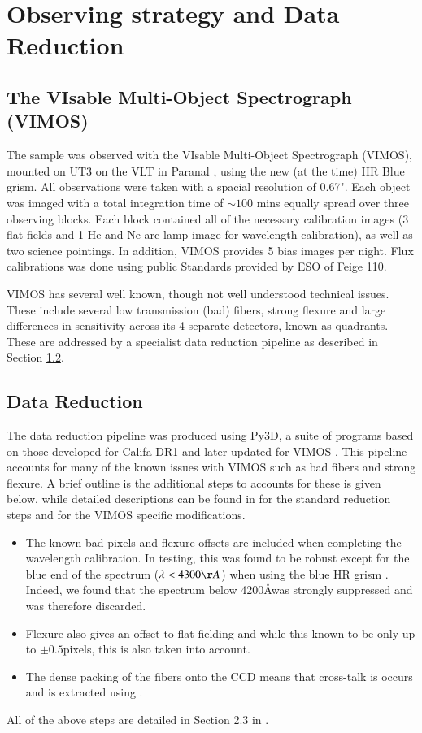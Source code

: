 \documentclass[fleqn,usenatbib,useAMS]{mnras}
\begin{document}
\section{Observing strategy and Data Reduction}
	\label{sec:obs}
	\subsection{The VIsable Multi-Object Spectrograph (VIMOS)}
		\label{subsec:VIMOS}
		The sample was observed with the VIsable Multi-Object Spectrograph (VIMOS), mounted on UT3 on the VLT in Paranal \citep{LeFevre2003}, using the new (at the time) HR Blue grism. All observations were taken with a spacial resolution of 0.67". Each object was imaged with a total integration time of $\sim 100$ mins equally spread over three observing blocks. Each block contained all of the necessary calibration images (3 flat fields and 1 He and Ne arc lamp image for wavelength calibration), as well as two science pointings. In addition, VIMOS provides 5 bias images per night. Flux calibrations was done using public Standards provided by ESO of Feige 110.

		VIMOS has several well known, though not well understood technical issues. These include several low transmission (bad) fibers, strong flexure and large differences in sensitivity across its 4 separate detectors, known as quadrants. These are addressed by a specialist data reduction pipeline as described in Section \ref{subsec:reduct}. 

	\subsection{Data Reduction}
		\label{subsec:reduct}
		The data reduction pipeline was produced using Py3D, a suite of programs based on those developed for Califa DR1 \citep{Sanchez2011, Husemann2013} and later updated for VIMOS \citep{Husemann2014}. This pipeline accounts for many of the known issues with VIMOS such as bad fibers and strong flexure. A brief outline is the additional steps to accounts for these is given below, while detailed descriptions can be found in \citet{Sanchez2011} for the standard reduction steps and \citep{Husemann2014} for the VIMOS specific modifications. 
		\begin{itemize}
		\item The known bad pixels and flexure offsets are included when completing the wavelength calibration. In testing, this was found to be robust except for the blue end of the spectrum ($\lambda < 4300 \AA$) when using the blue HR grism \citep{Husemann2014}. Indeed, we found that the spectrum below 4200\AA was strongly suppressed and was therefore discarded.
		\item Flexure also gives an offset to flat-fielding and while this known to be only up to $\pm0.5$pixels, this is also taken into account.
		\item The dense packing of the fibers onto the CCD means that cross-talk is occurs and is extracted using \citep{Horne1986}. 
		\end{itemize}
		All of the above steps are detailed in Section 2.3 in \citet{Husemann2014}.
\end{document}

